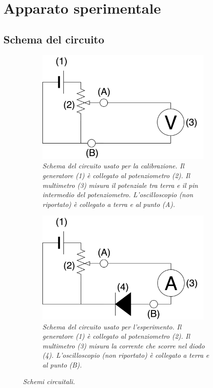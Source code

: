 \documentclass[11pt, a4paper, twoside]{article}
\begin{document}
\section{Apparato sperimentale}\label{sec:apparato-sperimentale}
  \subsection{Schema del circuito}\label{subsec:schema-circuito}
    \begin{figure}%
      \centering
      \begin{subfigure}[t]{.47\textwidth}
        \includegraphics[width=8.75cm]{./assets/1/circuito-calibrazione.png}
        \caption{
          \emph{
            Schema del circuito usato per la calibrazione. Il generatore (1) è collegato al potenziometro (2).
            Il multimetro (3) misura il potenziale tra terra e il pin intermedio del potenziometro.
            L'oscilloscopio (non riportato) è collegato a terra e al punto (A).
          }
        }
        \label{fig:circuito-calibrazione}
      \end{subfigure}
      \hspace{5mm}
      \begin{subfigure}[t]{.47\textwidth}
        \includegraphics[width=8.75cm]{./assets/1/circuito.png}
        \caption{
          \emph{
            Schema del circuito usato per l'esperimento. Il generatore (1) è collegato al potenziometro (2).
            Il multimetro (3) misura la corrente che scorre nel diodo (4). L'oscilloscopio (non riportato) è
            collegato a terra e al punto (B).
          }
        }
        \label{fig:circuito-prova}
      \end{subfigure}
      \caption{\emph{Schemi circuitali.}}
      \label{fig:circuiti}
    \end{figure}
\end{document}
